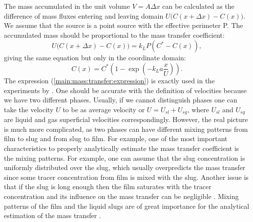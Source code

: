 \documentclass{article}
\newcommand{\beq}{\begin{equation}}
\newcommand{\feq}{\end{equation}}
\begin{document}
The mass accumulated in the unit volume $V=A \Delta x$ can be calculated as the difference of 
mass fluxes entering and leaving domain $U \bigl(C(x+\Delta x)-C(x)\bigr)$. We assume that the
source is a point source with the effective perimeter P. The accumulated mass should be proportional
to the mass transfer coefficient:
\beq
U \bigl(C(x+\Delta x)-C(x)\bigr)=k_L P (C^{*}-C(x)), 
\feq 
giving the same equation but only in the coordinate domain:
\beq
C(x)= C^{*}(1-\exp(-k_L a \frac{x}{U} )).
\label{main:mass:transfer:expression} 
\feq
The expression (\ref{main:mass:transfer:expression}) is exactly used in the experiments by
\citet{bercic-mass}. One should be accurate with the definition of velocities because we have two
different phases. Usually, if we cannot distinguish phases one can take the velocity $U$ to be as
average velocity or $U=U_{sl}+U_{sg}$, where $U_{sl}$ and $U_{sg}$ are liquid and gas superficial
velocities correspondingly. However, the real picture is much more complicated, as two phases can
have different mixing patterns from film to slug and from slug to film. For example, one of the
most important characteristics to properly analytically estimate the mass transfer coefficient is
the mixing patterns. For example, one can assume that the slug concentration is uniformly
distributed over the slug, which usually overpredicts the mass transfer \cite{irandoust} since some
tracer concentration from film is mixed with the slug. Another issue is that if the slug is long
enough then the film saturates with the tracer concentration and its influence on the mass transfer
can be negligible \cite{vanbaten-circular}. Mixing patterns of the film and the liquid slugs are of
great importance for the analytical estimation of the mass transfer \cite{yue-mass}.
 
\end{document}
